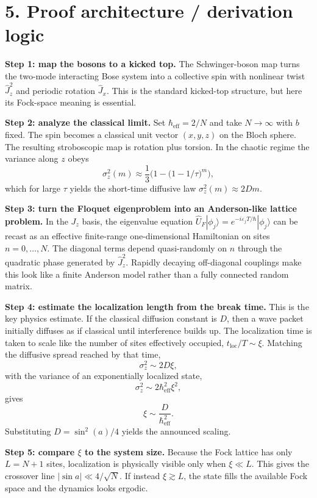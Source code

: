 \documentclass[11pt]{article}
\begin{document}
\section*{5. Proof architecture / derivation logic}
\textbf{Step 1: map the bosons to a kicked top.} The Schwinger-boson map turns the two-mode interacting Bose system into a collective spin with nonlinear twist $\hat J_z^2$ and periodic rotation $\hat J_x$. This is the standard kicked-top structure, but here its Fock-space meaning is essential.

\textbf{Step 2: analyze the classical limit.} Set $\hbar_\mathrm{eff}=2/N$ and take $N\to\infty$ with $b$ fixed. The spin becomes a classical unit vector $(x,y,z)$ on the Bloch sphere. The resulting stroboscopic map is rotation plus torsion. In the chaotic regime the variance along $z$ obeys
\[
\sigma_z^2(m)\approx \frac{1}{3}\Big(1-\big(1-1/\tau\big)^m\Big),
\]
which for large $\tau$ yields the short-time diffusive law $\sigma_z^2(m)\approx 2Dm$.

\textbf{Step 3: turn the Floquet eigenproblem into an Anderson-like lattice problem.} In the $J_z$ basis, the eigenvalue equation $\hat U_F|\phi_j\rangle=e^{-i\varepsilon_jT/\hbar}|\phi_j\rangle$ can be recast as an effective finite-range one-dimensional Hamiltonian on sites $n=0,\dots,N$. The diagonal terms depend quasi-randomly on $n$ through the quadratic phase generated by $\hat J_z^2$. Rapidly decaying off-diagonal couplings make this look like a finite Anderson model rather than a fully connected random matrix.

\textbf{Step 4: estimate the localization length from the break time.} This is the key physics estimate. If the classical diffusion constant is $D$, then a wave packet initially diffuses as if classical until interference builds up. The localization time is taken to scale like the number of sites effectively occupied, $t_\mathrm{loc}/T\sim \xi$. Matching the diffusive spread reached by that time,
\[
\sigma_z^2\sim 2D\xi,
\]
with the variance of an exponentially localized state,
\[
\sigma_z^2\sim 2\hbar_\mathrm{eff}^2\xi^2,
\]
gives
\[
\xi\sim \frac{D}{\hbar_\mathrm{eff}^2}.
\]
Substituting $D=\sin^2(a)/4$ yields the announced scaling.

\textbf{Step 5: compare $\xi$ to the system size.} Because the Fock lattice has only $L=N+1$ sites, localization is physically visible only when $\xi\ll L$. This gives the crossover line $|\sin a|\ll 4/\sqrt{N}$. If instead $\xi\gtrsim L$, the state fills the available Fock space and the dynamics looks ergodic.
\end{document}

